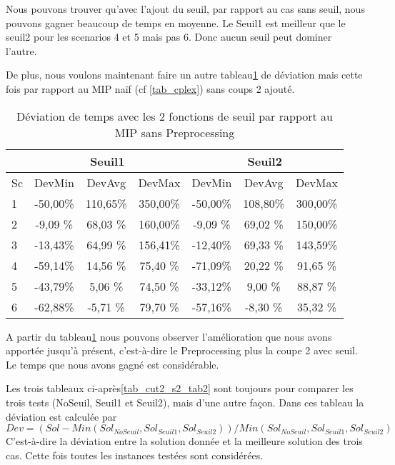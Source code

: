 Nous pouvons trouver qu'avec l'ajout du seuil, par rapport au cas sans seuil, nous pouvons gagner beaucoup de temps en moyenne. Le Seuil1 est meilleur que le seuil2 pour les scenarios 4 et 5 mais pas 6. Donc aucun seuil peut dominer l'autre.

De plus, nous voulons maintenant faire un autre tableau\ref{tab_cut2_seuil_tim_cmp2} de déviation mais cette fois par rapport au MIP naïf (cf \ref{tab_cplex}) sans coups 2 ajouté.
\begin{table}[h]
    \centering
    \begin{tabular}{|l|c|c|c|c|c|c|}
    	\hline
  &\multicolumn{3}{c}{Seuil1}	&\multicolumn{3}{|c|}{Seuil2}\\ \hline
 Sc  & 	DevMin	& DevAvg	& DevMax& 	DevMin	& DevAvg	&DevMax  \\ \hline
1&	-50,00\%&	110,65\%&	350,00\%&	-50,00\%&	108,80\%&	300,00\%    \\ \hline
2&	-9,09 \%&	68,03 \%&	160,00\%&	-9,09 \%&	69,02 \%&	150,00\%     \\ \hline
3&	-13,43\%&	64,99 \%&	156,41\%&	-12,40\%&	69,33 \%&	143,59\%  \\ \hline
4&	-59,14\%&	14,56 \%&	75,40 \%&	-71,09\%&	20,22 \%&	91,65 \%    \\ \hline
5&	-43,79\%&	5,06	\%&74,50 \%&    -33,12\%&	9,00	\%&88,87  \%     \\ \hline
6&	-62,88\%&	-5,71 \%&	79,70 \%&	-57,16\%&	-8,30 \%&	35,32 \%  \\ \hline
    \end{tabular}
    \caption{Déviation de temps avec les 2 fonctions de seuil par rapport au MIP sans Preprocessing}
    \label{tab_cut2_seuil_tim_cmp2}
\end{table}
\bigskip

A partir du tableau\ref{tab_cut2_seuil_tim_cmp2} nous pouvons observer l'amélioration que nous avons apportée jusqu'à présent, c'est-à-dire le Preprocessing plus la coupe 2 avec seuil. Le temps que nous avons gagné est considérable.

Les trois tableaux ci-après\ref{tab_cut2_s2_tab2} sont toujours pour comparer les trois tests (NoSeuil, Seuil1 et Seuil2), mais d'une autre façon. Dans ces tableau la déviation est calculée par $$Dev = (Sol - Min(Sol_{NoSeuil}, Sol_{Seuil1}, Sol_{Seuil2}))/Min(Sol_{NoSeuil}, Sol_{Seuil1}, Sol_{Seuil2})$$C'est-à-dire la déviation entre la solution donnée et la meilleure solution des trois cas. Cette fois toutes les instances testées sont considérées.

